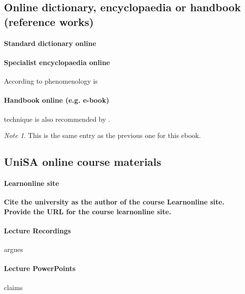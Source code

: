 \documentclass[a4paper,australian,oneside,12pt,footlines=3]{scrbook}%
\newcommand{\instruction}[1]{\textbf{#1}}
\theoremstyle{remark}
\newtheorem*{note}{Note}
\begin{document}
\begin{refsection}
\section{Online dictionary, encyclopaedia or handbook (reference works)}
\paragraph{Standard dictionary online}

\paragraph{Specialist encyclopaedia online}
According to \textcite{Smith2011} phenomenology is \textelp{}

\paragraph{Handbook online (e.g. e-book)}
\textelp{}technique is also recommended by \textcite{Flann2014}.
\begin{note}
This is the same entry as the previous one for this ebook.
\end{note}
\printbibliography[heading=subbibliography]
\end{refsection}

\begin{refsection}
\section{UniSA online course materials}
\paragraph{Learnonline site}
\instruction{Cite the university as the author of the course Learnonline site. Provide the URL for the course learnonline site.}
\textelp{} \parencite{MEDI1001}

\paragraph{Lecture Recordings}
\textcite{MEDI1001lr} argues\textelp{}

\paragraph{Lecture PowerPoints}
\textcite{MEDI1001ppt} claims\textelp{}
\printbibliography[heading=subbibliography]
\end{refsection}
\end{document}
